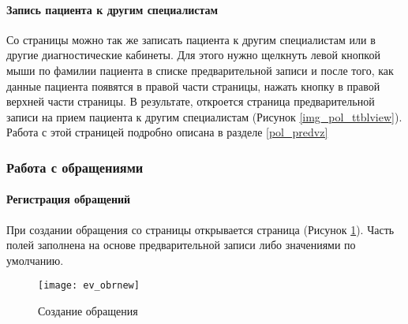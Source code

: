 {\paragraph{Запись пациента к другим специалистам}

Со страницы  можно так же записать пациента к другим специалистам  или в другие диагностические кабинеты. Для этого нужно щелкнуть левой кнопкой мыши по фамилии пациента в списке предварительной записи и после того, как данные пациента появятся в правой части страницы, нажать кнопку  в правой верхней части страницы. В результате, откроется страница предварительной записи на прием пациента к другим специалистам (Рисунок \ref{img_pol_ttblview}). Работа с этой страницей подробно описана в разделе \ref{pol_predvz}

\subsubsection{Работа с обращениями}
\paragraph{Регистрация обращений}

При создании обращения со страницы  открывается страница  (Рисунок \ref{img_ev_obrnew}). Часть полей заполнена на основе  предварительной записи либо значениями по умолчанию. 

\begin{figure}[ht]\centering
	\texttt{[image: ev\_obrnew]}
	\caption{Создание обращения}
	\label{img_ev_obrnew}
\end{figure}

}

